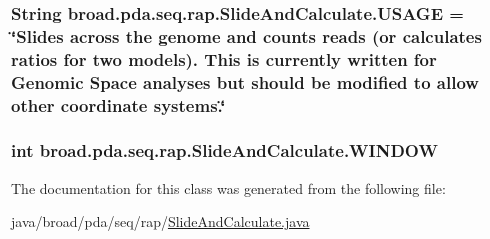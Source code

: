 \hypertarget{classbroad_1_1pda_1_1seq_1_1rap_1_1_slide_and_calculate_a664325284c4f1d73adbc6d642db4ef09}{
\subsubsection[{U\+S\+A\+G\+E}]{\setlength{\rightskip}{0pt plus 5cm}String broad.\+pda.\+seq.\+rap.\+Slide\+And\+Calculate.\+U\+S\+A\+G\+E = \char`\"{}Slides across the genome and counts reads (or calculates ratios for two models). This is currently written for Genomic Space analyses but should be modified to allow other coordinate systems.\char`\"{}}}\label{classbroad_1_1pda_1_1seq_1_1rap_1_1_slide_and_calculate_a664325284c4f1d73adbc6d642db4ef09}
\hypertarget{classbroad_1_1pda_1_1seq_1_1rap_1_1_slide_and_calculate_ac2b84e21fea216344c7142f303ce012d}{
\subsubsection[{W\+I\+N\+D\+O\+W}]{\setlength{\rightskip}{0pt plus 5cm}int broad.\+pda.\+seq.\+rap.\+Slide\+And\+Calculate.\+W\+I\+N\+D\+O\+W}}\label{classbroad_1_1pda_1_1seq_1_1rap_1_1_slide_and_calculate_ac2b84e21fea216344c7142f303ce012d}


The documentation for this class was generated from the following file\+:\begin{DoxyCompactItemize}
\item 
java/broad/pda/seq/rap/\hyperlink{_slide_and_calculate_8java}{Slide\+And\+Calculate.\+java}\end{DoxyCompactItemize}
